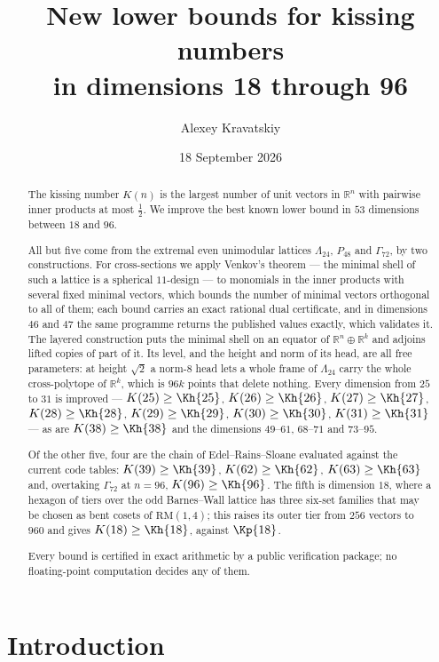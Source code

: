 \documentclass[11pt]{amsart}
\title[Kissing numbers in dimensions 18 to 96]
      {New lower bounds for kissing numbers\\in dimensions 18 through 96}
\author{Alexey Kravatskiy}
\date{18 September 2026}
\theoremstyle{remark}
\newcommand{\Leech}{\Lambda_{24}}
\newcommand{\Pff}{P_{48}}
\newcommand{\Gsz}{\Gamma_{72}}
\newcommand{\R}{\mathbb{R}}
\begin{document}
\begin{abstract}
The kissing number $K(n)$ is the largest number of unit vectors in $\R^n$ with
pairwise inner products at most $\tfrac12$. We improve the best known lower bound
in $53$ dimensions between $18$ and $96$.

All but five come from the extremal even unimodular lattices $\Leech$, $\Pff$ and
$\Gsz$, by two constructions. For cross-sections we apply Venkov's theorem --- the
minimal shell of such a lattice is a spherical $11$-design --- to monomials in the
inner products with several fixed minimal vectors, which bounds the number of
minimal vectors orthogonal to all of them; each bound carries an exact rational
dual certificate, and in dimensions $46$ and $47$ the same programme returns the
published values exactly, which validates it. The layered construction puts the
minimal shell on an equator of $\R^{n}\oplus\R^{k}$ and adjoins lifted copies of
part of it. Its level, and the height and norm of its head, are all free
parameters: at height $\sqrt2$ a norm-$8$ head lets a whole frame of $\Leech$
carry the whole cross-polytope of $\R^{k}$, which is $96k$ points that delete
nothing. Every dimension from $25$ to $31$ is improved --- $K(25)\ge\Kh{25}$,
$K(26)\ge\Kh{26}$, $K(27)\ge\Kh{27}$, $K(28)\ge\Kh{28}$, $K(29)\ge\Kh{29}$,
$K(30)\ge\Kh{30}$, $K(31)\ge\Kh{31}$ --- as are $K(38)\ge\Kh{38}$ and the
dimensions $49$--$61$, $68$--$71$ and $73$--$95$.

Of the other five, four are the chain of Edel--Rains--Sloane evaluated against
the current code tables: $K(39)\ge\Kh{39}$, $K(62)\ge\Kh{62}$,
$K(63)\ge\Kh{63}$ and, overtaking $\Gsz$ at $n=96$, $K(96)\ge\Kh{96}$. The
fifth is dimension $18$, where a hexagon of tiers
over the odd Barnes--Wall lattice has three six-set families that may be chosen as
bent cosets of $\mathrm{RM}(1,4)$; this raises its outer tier from $256$ vectors
to $960$ and gives $K(18)\ge\Kh{18}$, against $\Kp{18}$.

Every bound is certified in exact arithmetic by a public verification package; no
floating-point computation decides any of them.
\end{abstract}

\maketitle

\section{Introduction}\label{sec:intro}
\end{document}

